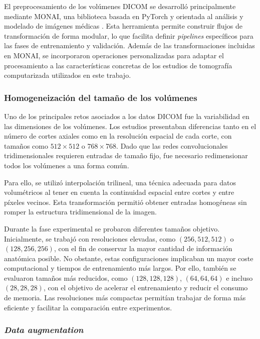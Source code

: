 El preprocesamiento de los volúmenes DICOM se desarrolló principalmente mediante MONAI, una biblioteca basada en PyTorch y orientada al análisis y modelado de imágenes médicas \cite{cardoso2022monai}. Esta herramienta permite construir flujos de transformación de forma modular, lo que facilita definir \textit{pipelines} específicos para las fases de entrenamiento y validación. Además de las transformaciones incluidas en MONAI, se incorporaron operaciones personalizadas para adaptar el procesamiento a las características concretas de los estudios de tomografía computarizada utilizados en este trabajo.

\subsubsection{Homogeneización del tamaño de los volúmenes}

Uno de los principales retos asociados a los datos DICOM fue la variabilidad en las dimensiones de los volúmenes. Los estudios presentaban diferencias tanto en el número de cortes axiales como en la resolución espacial de cada corte, con tamaños como $512 \times 512$ o $768 \times 768$. Dado que las redes convolucionales tridimensionales requieren entradas de tamaño fijo, fue necesario redimensionar todos los volúmenes a una forma común.

Para ello, se utilizó interpolación trilineal, una técnica adecuada para datos volumétricos al tener en cuenta la continuidad espacial entre cortes y entre píxeles vecinos. Esta transformación permitió obtener entradas homogéneas sin romper la estructura tridimensional de la imagen.

Durante la fase experimental se probaron diferentes tamaños objetivo. Inicialmente, se trabajó con resoluciones elevadas, como $(256,512,512)$ o $(128,256,256)$, con el fin de conservar la mayor cantidad de información anatómica posible. No obstante, estas configuraciones implicaban un mayor coste computacional y tiempos de entrenamiento más largos. Por ello, también se evaluaron tamaños más reducidos, como $(128,128,128)$, $(64,64,64)$ e incluso $(28,28,28)$, con el objetivo de acelerar el entrenamiento y reducir el consumo de memoria. Las resoluciones más compactas permitían trabajar de forma más eficiente y facilitar la comparación entre experimentos.


\subsubsection{\textit{Data augmentation}}

